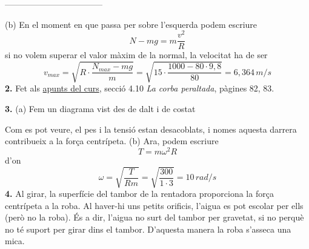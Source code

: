 \documentclass[a4paper,12pt]{article}
\begin{document}
-----------------------------------
\begin{center}
\end{center}

\noindent (b) En el moment en que passa per sobre l'esquerda podem escriure
$$N-mg=m\frac{v^{2}}{R}$$
si no volem superar el valor màxim de la normal, la velocitat ha de ser
$$v_{max}=\sqrt{R\cdot\frac{N_{max}-mg}{m}}=\sqrt{15\cdot\frac{1000-80\cdot9,8}{80}}=6,364\,m/s$$
\noindent\textbf{2.} Fet als \textcolor{cyan!20!green}{\href{https://artur-sjo.github.io/Fisica_1r_Btx/Fis_1r.pdf}{apunts del curs}}, secció 4.10 \emph{La corba peraltada}, pàgines 82, 83.
\bigskip

\noindent\textbf{3.} (a) Fem un diagrama vist des de dalt i de costat
\begin{center}
\end{center}
Com es pot veure, el pes i la tensió estan desacoblats, i nomes aquesta darrera contribueix a la força centrípeta.
\noindent(b) Ara, podem escriure
$$T=m\omega^{2}R$$
d'on
$$\omega=\sqrt{\frac{T}{Rm}}=\sqrt{\frac{300}{1\cdot3}}=10\,rad/s$$
\noindent\textbf{4.} Al girar, la superfície del tambor de la rentadora proporciona la força centrípeta a la roba. Al haver-hi uns petits orificis, l'aigua es pot escolar per ells (però no la roba). És a dir, l'aigua no surt del tambor per gravetat, si no perquè no té suport per girar dins el tambor. D'aquesta manera la roba s'asseca una mica. 
\end{document}
